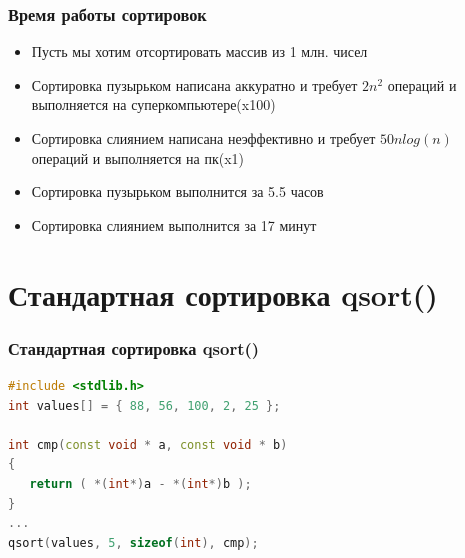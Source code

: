 \documentclass[12pt,pdf,hyperref={unicode}]{beamer}
\begin{document}
\begin{frame}[fragile]
\frametitle{Время работы сортировок} 
\begin{itemize}
\item Пусть мы хотим отсортировать массив из 1 млн. чисел
\item Сортировка пузырьком написана аккуратно и требует $2n^2$ операций и выполняется на суперкомпьютере(x100)
\item Сортировка слиянием написана неэффективно и требует $50 n log(n)$ операций и выполняется на пк(x1)
\item Сортировка пузырьком выполнится за 5.5 часов \\
\item Сортировка слиянием выполнится за 17 минут \\
\end{itemize}
\end{frame}




\section{Стандартная сортировка qsort()}


\begin{frame}[fragile]
\frametitle{Стандартная сортировка qsort()} 
\begin{lstlisting}[language=C++,basicstyle=\ttfamily,keywordstyle=\color{blue}]
#include <stdlib.h>
int values[] = { 88, 56, 100, 2, 25 };

int cmp(const void * a, const void * b)
{
   return ( *(int*)a - *(int*)b );
}
...
qsort(values, 5, sizeof(int), cmp);

\end{lstlisting}
\end{frame}
\end{document}
